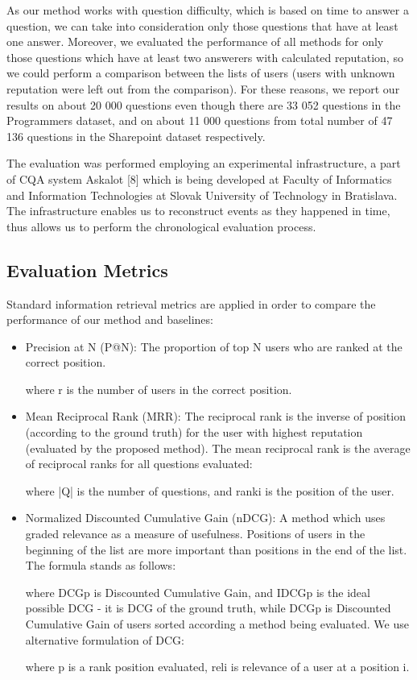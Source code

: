 \documentclass{llncs}
\begin{document}
			As our method works with question difficulty, which is based on time to answer
			a question, we can take into consideration only those questions that have at
			least one answer. Moreover, we evaluated the performance of all methods for only
			those questions which have at least two answerers with calculated reputation, so
			we could perform a comparison between the lists of users (users with unknown
			reputation were left out from the comparison). For these reasons, we report our
			results on about 20 000 questions even though there are 33 052 questions in
			the Programmers dataset, and on about 11 000 questions from total number of
			47 136 questions in the Sharepoint dataset respectively.
			
			The evaluation was performed employing an experimental infrastructure, a
			part of CQA system Askalot [8] which is being developed at Faculty of Informatics
			and Information Technologies at Slovak University of Technology in
			Bratislava. The infrastructure enables us to reconstruct events as they happened
			in time, thus allows us to perform the chronological evaluation process.

		
		\subsection{Evaluation Metrics}
			
			Standard information retrieval metrics are applied in order to compare the performance
			of our method and baselines:

		\begin{itemize}
			\item Precision at N (P@N): The proportion of top N users who are ranked at the
			correct position.
			
			where r is the number of users in the correct position.
			\item Mean Reciprocal Rank (MRR): The reciprocal rank is the inverse of position
			(according to the ground truth) for the user with highest reputation (evaluated
			by the proposed method). The mean reciprocal rank is the average of
			reciprocal ranks for all questions evaluated:
			
			where |Q| is the number of questions, and ranki	is the position of the user.
			\item Normalized Discounted Cumulative Gain (nDCG): A method which uses
			graded relevance as a measure of usefulness. Positions of users in the beginning
			of the list are more important than positions in the end of the list. The
			formula stands as follows:
			
			where DCGp is Discounted Cumulative Gain, and IDCGp is the ideal possible
			DCG - it is DCG of the ground truth, while DCGp is Discounted
			Cumulative Gain of users sorted according a method being evaluated. We
			use alternative formulation of DCG:
			
			where p is a rank position evaluated, reli
			is relevance of a user at a position i.
		\end{itemize}
	
\end{document}
